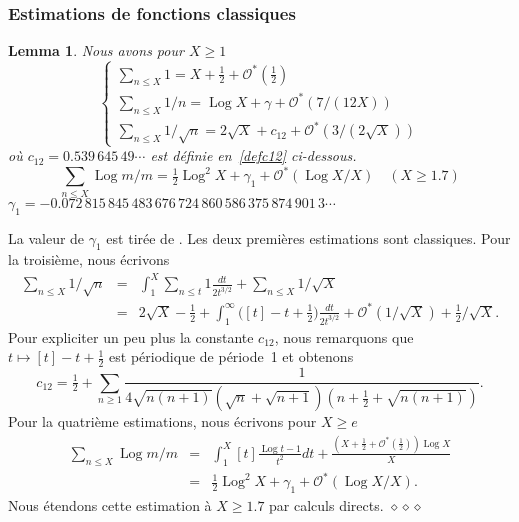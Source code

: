 \documentclass[12pt,a4paper,twoside]{article}
\newtheorem{lem}{Lemma}[section]
\newenvironment{dem}{\medbreak\noindent{\sc Preuve : }}%
{\hfill $\diamond\diamond\diamond$\par\medbreak}
\def\Ocal{\mathcal{O}}
\DeclareMathOperator{\Log}{Log}
\begin{document}
\subsubsection{Estimations de fonctions classiques}

\begin{lem}
  Nous avons pour $X\ge1$
  \begin{equation*}
    \left\{\begin{array}{l}
        \displaystyle
        \sum_{n\le X}1=X+\tfrac12+\Ocal^*(\tfrac12) \\[1em]
         \displaystyle
       \sum_{n\le X}1/n=\Log X+\gamma+\Ocal^*(7/(12X)) \\
        \displaystyle
        \sum_{n\le X}1/\sqrt{n}=2\sqrt{X}+c_{12}+\Ocal^*(3/(2\sqrt{X})) 
      \end{array}
      \right.
    \end{equation*}
  o\`u $c_{12}=0.539\,645\,49\cdots$ est d\'efinie en~\eqref{defc12} ci-dessous.
  \begin{equation*}
    \sum_{n\le X}\Log m/m=\tfrac12\Log^2X+\gamma_1+\Ocal^*(\Log X/X) \quad(X\ge 1.7)
  \end{equation*}
  $\gamma_1=-0.072\,815\,845\,483\,676\,724\,860\,586\,375\,874\,901\,3\cdots$
\end{lem}%
La valeur de $\gamma_1$ est tir\'ee de \cite{Keiper*92}.
\begin{dem}
  Les deux premi\`eres estimations sont classiques. Pour la troisi\`eme, nous
  \'ecrivons
  \begin{eqnarray*}
    \sum_{n\le X}1/\sqrt{n}
    &=&\int_1^X\sum_{n\le t}1\frac{dt}{2t^{3/2}}+\sum_{n\le X}1/\sqrt{X}
    \\&=&2\sqrt{X}-\tfrac12+
    \int_1^\infty\bigl([t]-t+\tfrac12\bigr)\frac{dt}{2t^{3/2}}
    +\Ocal^*(1/\sqrt{X})+\tfrac12/\sqrt{X}.
  \end{eqnarray*}
  Pour expliciter un peu plus la constante $c_{12}$, nous remarquons que
  $t\mapsto [t]-t+\tfrac12$ est p\'eriodique de p\'eriode~1 et obtenons
  \begin{equation}\label{defc12}
    c_{12}=\tfrac12+\sum_{n\ge1}
    \frac1{4\sqrt{n(n+1)}(\sqrt{n}+\sqrt{n+1})(n+\tfrac12+\sqrt{n(n+1)})}.
   \end{equation}
   Pour la quatri\`eme estimations, nous \'ecrivons pour $X\ge e$
   \begin{eqnarray*}
     \sum_{n\le X}\Log m/m
     &=&\int_1^X[t]\frac{\Log t -1}{t^2}dt
     +\frac{(X+\tfrac12+\Ocal^*(\tfrac12))\Log X}{X}
     \\&=&
     \tfrac12\Log^2X+\gamma_1
     +\Ocal^*(\Log X/X).
   \end{eqnarray*}
   Nous \'etendons cette estimation \`a $X\ge1.7$ par calculs directs.
\end{dem}
\end{document}
